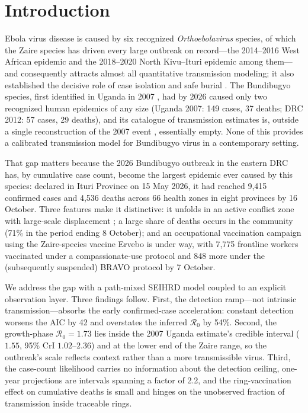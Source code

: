 \documentclass[preprint,12pt,numbers]{elsarticle}
\newcommand{\Reff}{\mathcal{R}}
\begin{document}
\section{Introduction}\label{sec:intro}

Ebola virus disease is caused by six recognized \emph{Orthoebolavirus}
species, of which the Zaire species has driven every large outbreak on
record---the 2014--2016 West African epidemic and the 2018--2020 North
Kivu--Ituri epidemic among them---and consequently attracts almost all
quantitative transmission modeling; it also established the decisive
role of case isolation and safe burial \cite{Pandey2014,Kucharski2015,Merler2015,Meltzer2014}.
The Bundibugyo species, first identified in Uganda in 2007
\cite{Wamala2010}, had by 2026 caused only two recognized human
epidemics of any size (Uganda 2007: 149 cases, 37 deaths; DRC 2012: 57
cases, 29 deaths), and its catalogue of transmission estimates is,
outside a single reconstruction of the 2007 event \cite{DePadua2026},
essentially empty. None of this provides a calibrated transmission
model for Bundibugyo virus in a contemporary setting.

That gap matters because the 2026 Bundibugyo outbreak in the eastern DRC
has, by cumulative case count, become the largest epidemic ever caused
by this species: declared in Ituri Province on 15 May 2026, it had reached 9{,}415 confirmed cases and
4{,}536 deaths across 66 health zones in eight provinces by 16 October. Three features make it distinctive: it unfolds in an
active conflict zone with large-scale displacement \cite{SSHAP2026}; a
large share of deaths occurs in the community (71\%
in the period ending 8 October); and an
occupational vaccination campaign using the Zaire-species vaccine Ervebo
is under way, with 7{,}775 frontline workers vaccinated under a
compassionate-use protocol and 848 more under the (subsequently
suspended) BRAVO protocol by 7 October.

We address the gap with a path-mixed SEIHRD model coupled to an explicit
observation layer. Three findings follow. First, the detection
ramp---not intrinsic transmission---absorbs the early confirmed-case
acceleration: constant detection worsens the AIC by 42 and overstates
the inferred $\Reff_0$ by 54\%. Second, the growth-phase $\Reff_0=1.73$
lies inside the 2007 Uganda estimate's credible interval ($1.55$, 95\%
CrI $1.02$--$2.36$) and at the lower end of the Zaire range, so the
outbreak's scale reflects context rather than a more transmissible
virus. Third, the case-count likelihood carries no information about the
detection ceiling, one-year projections are intervals spanning a factor
of 2.2, and the ring-vaccination effect on cumulative deaths is small
and hinges on the unobserved fraction of transmission inside traceable
rings.
\end{document}
